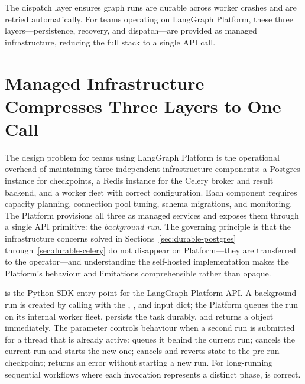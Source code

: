 The dispatch layer ensures graph runs are durable across worker crashes
and are retried automatically. For teams operating on LangGraph Platform,
these three layers---persistence, recovery, and dispatch---are provided
as managed infrastructure, reducing the full stack to a single API call.


\section{Managed Infrastructure Compresses Three Layers to One Call}
\label{sec:durable-platform}

The design problem for teams using LangGraph Platform is the operational
overhead of maintaining three independent infrastructure components: a
Postgres instance for checkpoints, a Redis instance for the Celery broker
and result backend, and a worker fleet with correct 
configuration. Each component requires capacity planning, connection pool
tuning, schema migrations, and monitoring. The Platform provisions all
three as managed services and exposes them through a single API primitive:
the \emph{background run}. The governing principle is that the infrastructure
concerns solved in Sections~\ref{sec:durable-postgres}
through~\ref{sec:durable-celery} do not disappear on Platform---they are
transferred to the operator---and understanding the self-hosted implementation
makes the Platform's behaviour and limitations comprehensible rather than
opaque.

 is the Python SDK entry point for the LangGraph
Platform API. A background run is created by calling
 with the , ,
and input dict; the Platform queues the run on its internal worker fleet,
persists the task durably, and returns a  object immediately.
The  parameter controls behaviour when a second
run is submitted for a thread that is already active: 
queues it behind the current run;  cancels the current
run and starts the new one;  cancels and reverts state
to the pre-run checkpoint;  returns an error without
starting a new run. For long-running sequential workflows where each
invocation represents a distinct phase,  is correct.

